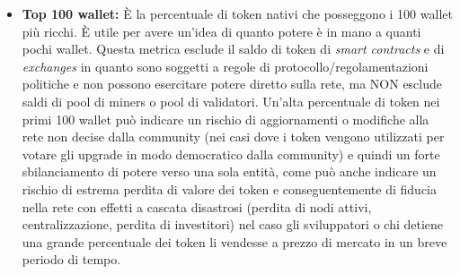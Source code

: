\documentclass[a4paper, 12pt]{article}
\begin{document}
\begin{itemize}
\item \textbf{Top 100 wallet: }
È la percentuale di token nativi che posseggono i 100 wallet più ricchi.
È utile per avere un'idea di quanto potere è in mano a quanti pochi wallet.
Questa metrica esclude il saldo di token di \textit{smart contracts} e di \textit{exchanges} in quanto sono soggetti a regole di protocollo/regolamentazioni politiche e
non possono esercitare potere diretto sulla rete, ma NON esclude saldi di pool di miners o pool di validatori.
Un'alta percentuale di token nei primi 100 wallet può indicare un rischio di aggiornamenti o modifiche alla rete non decise dalla community (nei casi dove i token
vengono utilizzati per votare gli upgrade in modo democratico dalla community) e quindi un forte sbilanciamento di potere verso una sola entità, come può anche indicare un rischio
di estrema perdita di valore dei token e conseguentemente di fiducia nella rete con effetti a cascata disastrosi (perdita di nodi attivi, centralizzazione, perdita di investitori) nel caso gli sviluppatori o chi detiene una grande percentuale dei token li vendesse a prezzo di mercato in un breve periodo di tempo.

\end{itemize}

\newpage
\end{document}
